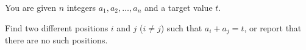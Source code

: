 You are given $n$ integers $a_1, a_2, \ldots, a_n$ and a target value $t$.

Find two different positions $i$ and $j$ ($i \ne j$) such that $a_i + a_j = t$, or report that there are no such positions.
